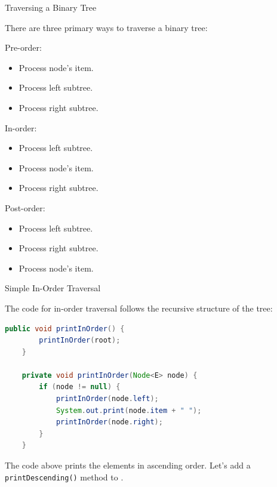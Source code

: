\documentclass{beamer}
\begin{document}
\begin{frame}[fragile]{Traversing a Binary Tree}


There are three primary ways to traverse a binary tree:

Pre-order:
\begin{itemize}
\item Process node's item.
\item Process left subtree.
\item Process right subtree.
\end{itemize}

In-order:
\begin{itemize}
\item Process left subtree.
\item Process node's item.
\item Process right subtree.
\end{itemize}

Post-order:
\begin{itemize}
\item Process left subtree.
\item Process right subtree.
\item Process node's item.
\end{itemize}


\end{frame}

\begin{frame}[fragile]{Simple In-Order Traversal}

The code for in-order traversal follows the recursive structure of the tree:
\begin{lstlisting}[language=Java]
    public void printInOrder() {
        printInOrder(root);
    }

    private void printInOrder(Node<E> node) {
        if (node != null) {
            printInOrder(node.left);
            System.out.print(node.item + " ");
            printInOrder(node.right);
        }
    }
\end{lstlisting}
The code above prints the elements in ascending order.
Let's add a {\tt printDescending()} method to .

\end{frame}
\end{document}
